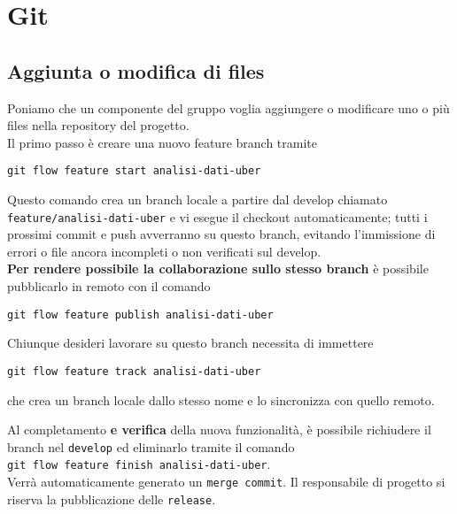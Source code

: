 

\chapter{Git}

\section{Aggiunta o modifica di files}
Poniamo che un componente del gruppo voglia aggiungere o modificare uno o pi\`{u} files nella repository del progetto. \\
Il primo passo \`{e} creare una nuovo feature branch tramite
\begin{lstlisting}
git flow feature start analisi-dati-uber
\end{lstlisting}
Questo comando crea un branch locale a partire dal develop chiamato \texttt{feature/analisi-dati-uber} e vi esegue il checkout automaticamente; tutti i prossimi commit e push avverranno su questo branch, evitando l'immissione di errori o file ancora incompleti o non verificati sul develop. \\
\textbf{Per rendere possibile la collaborazione sullo stesso branch} \`{e} possibile pubblicarlo in remoto con il comando
\begin{lstlisting}
git flow feature publish analisi-dati-uber
\end{lstlisting}
Chiunque desideri lavorare su questo branch necessita di immettere
\begin{lstlisting}
git flow feature track analisi-dati-uber
\end{lstlisting}
che crea un branch locale dallo stesso nome e lo sincronizza con quello remoto.

Al completamento \textbf{e verifica} della nuova funzionalit\`{a}, \`{e} possibile richiudere il branch nel \texttt{develop} ed eliminarlo tramite il comando \\
\texttt{git flow feature finish analisi-dati-uber}.\\
Verr\`{a} automaticamente generato un \texttt{merge commit}.
Il responsabile di progetto si riserva la pubblicazione delle \texttt{release}.\\
\\
